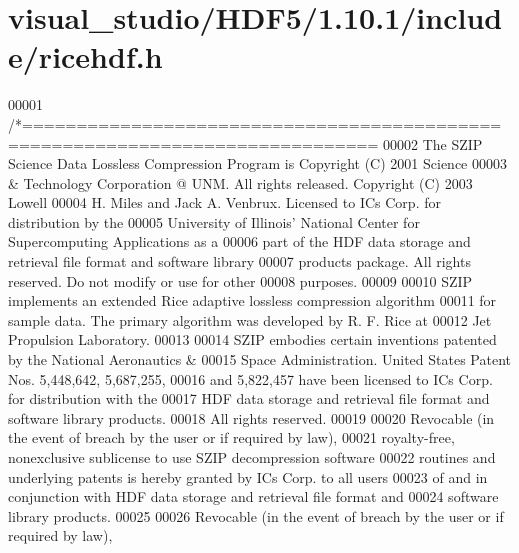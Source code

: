 \hypertarget{visual__studio_2_h_d_f5_21_810_81_2include_2ricehdf_8h_source}{}\section{visual\+\_\+studio/\+H\+D\+F5/1.10.1/include/ricehdf.h}
\label{visual__studio_2_h_d_f5_21_810_81_2include_2ricehdf_8h_source}

\begin{DoxyCode}
00001 \textcolor{comment}{/*==============================================================================}
00002 \textcolor{comment}{The SZIP Science Data Lossless Compression Program is Copyright (C) 2001 Science}
00003 \textcolor{comment}{& Technology Corporation @ UNM.  All rights released.  Copyright (C) 2003 Lowell}
00004 \textcolor{comment}{H. Miles and Jack A. Venbrux.  Licensed to ICs Corp. for distribution by the}
00005 \textcolor{comment}{University of Illinois' National Center for Supercomputing Applications as a}
00006 \textcolor{comment}{part of the HDF data storage and retrieval file format and software library}
00007 \textcolor{comment}{products package.  All rights reserved.  Do not modify or use for other}
00008 \textcolor{comment}{purposes.}
00009 \textcolor{comment}{}
00010 \textcolor{comment}{SZIP implements an extended Rice adaptive lossless compression algorithm}
00011 \textcolor{comment}{for sample data.  The primary algorithm was developed by R. F. Rice at}
00012 \textcolor{comment}{Jet Propulsion Laboratory.  }
00013 \textcolor{comment}{}
00014 \textcolor{comment}{SZIP embodies certain inventions patented by the National Aeronautics &}
00015 \textcolor{comment}{Space Administration.  United States Patent Nos. 5,448,642, 5,687,255,}
00016 \textcolor{comment}{and 5,822,457 have been licensed to ICs Corp. for distribution with the}
00017 \textcolor{comment}{HDF data storage and retrieval file format and software library products.}
00018 \textcolor{comment}{All rights reserved.}
00019 \textcolor{comment}{}
00020 \textcolor{comment}{Revocable (in the event of breach by the user or if required by law), }
00021 \textcolor{comment}{royalty-free, nonexclusive sublicense to use SZIP decompression software }
00022 \textcolor{comment}{routines and underlying patents is hereby granted by ICs Corp. to all users }
00023 \textcolor{comment}{of and in conjunction with HDF data storage and retrieval file format and }
00024 \textcolor{comment}{software library products.}
00025 \textcolor{comment}{}
00026 \textcolor{comment}{Revocable (in the event of breach by the user or if required by law), }

\end{DoxyCode}
